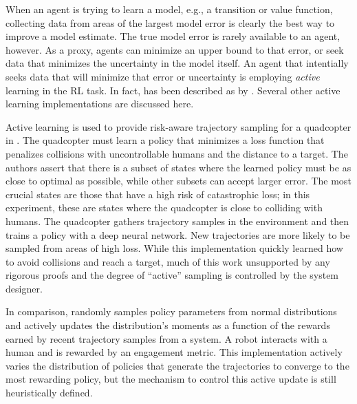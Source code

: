     When an agent is trying to learn a model, e.g., a transition or value function, collecting data from areas of the
    largest model error is clearly the best way to improve a model estimate. The true model error is rarely available to
    an agent, however. As a proxy, agents can minimize an upper bound to that error, or seek data that minimizes the
    uncertainty in the model itself. An agent that intentially seeks data that will minimize that error or uncertainty
    is employing \emph{active} learning in the \ac{RL} task. In fact, \DAGGER  \cite{ross2011reduction} has been
    described as  by \cite{andersson2017deep}. Several other active
    learning implementations are discussed here.

    Active learning is used to provide risk-aware trajectory sampling for a quadcopter in \cite{andersson2017deep}. The
    quadcopter must learn a policy that minimizes a loss function that penalizes collisions with uncontrollable humans
    and the distance to a target. The authors assert that there is a subset of states where the learned policy must be
    as close to optimal as possible, while other subsets can accept larger error. The most crucial states are those that
    have a high risk of catastrophic loss; in this experiment, these are states where the quadcopter is close to
    colliding with humans. The quadcopter gathers trajectory samples in the environment and then trains a policy with a
    deep neural network. New trajectories are more likely to be sampled from areas of high loss. While this
    implementation quickly learned how to avoid collisions and reach a target, much of this work unsupported by any
    rigorous proofs and the degree of ``active'' sampling is controlled by the system designer.

    In comparison, \cite{khamassi2017active} randomly samples policy parameters from normal distributions and actively
    updates the distribution's moments as a function of the rewards earned by recent trajectory samples from a system. A
    robot interacts with a human and is rewarded by an engagement metric. This implementation actively varies the
    distribution of policies that generate the trajectories to converge to the most rewarding policy, but the mechanism
    to control this active update is still heuristically defined.

